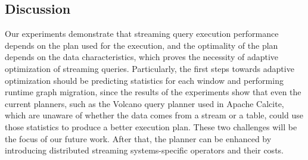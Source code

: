 \subsection{Discussion}

Our experiments demonstrate that streaming query execution performance depends on the plan used for the execution, and the optimality of the plan depends on the data characteristics, which proves the necessity of adaptive optimization of streaming queries. Particularly, the first steps towards adaptive optimization should be predicting statistics for each window and performing runtime graph migration, since the results of the experiments show that even the current planners, such as the Volcano query planner \cite{graefe1993volcano} used in Apache Calcite, which are unaware of whether the data comes from a stream or a table, could use those statistics to produce a better execution plan. These two challenges will be the focus of our future work. After that, the planner can be enhanced by introducing distributed streaming systems-specific operators and their costs.
